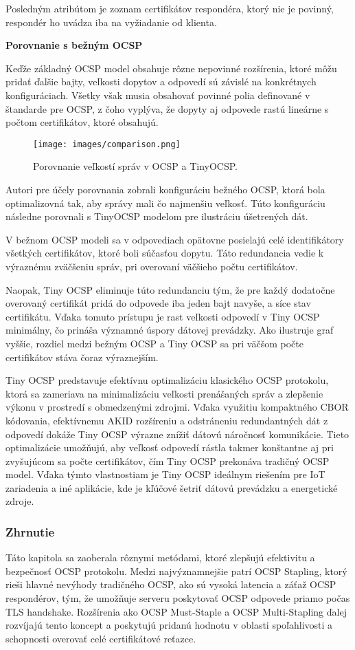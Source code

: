 \documentclass[12pt, twoside]{book}
\newcommand{\subsubsubsection}[1]{%
  \vspace{0.2em}  
  \textbf{#1} \\[0.2em]
  \hspace*{\parindent}
}
\begin{document}
Posledným atribútom je zoznam certifikátov respondéra, ktorý nie je povinný, respondér ho uvádza iba na vyžiadanie od klienta.


\subsubsubsection{Porovnanie s bežným OCSP}
Keďže základný OCSP model obsahuje rôzne nepovinné rozšírenia, ktoré môžu pridať ďalšie bajty, veľkosti dopytov a odpovedí sú závislé na konkrétnych konfiguráciach. Všetky však musia obsahovať povinné polia definované v štandarde pre OCSP, z čoho vyplýva, že dopyty aj odpovede rastú lineárne s počtom certifikátov, ktoré obsahujú.

\begin{figure}[H]
\centering
\texttt{[image: images/comparison.png]}
\caption{Porovnanie veľkostí správ v OCSP a TinyOCSP.}
\end{figure}

Autori pre účely porovnania zobrali konfiguráciu bežného OCSP, ktorá bola optimalizovná tak, aby správy mali čo najmenšiu veľkosť. Túto konfiguráciu následne porovnali s TinyOCSP modelom pre ilustráciu úšetrených dát.

V bežnom OCSP modeli sa v odpovediach opätovne posielajú celé identifikátory všetkých certifikátov, ktoré boli súčasťou dopytu. Táto redundancia vedie k výraznému zväčšeniu správ, pri overovaní väčšieho počtu certifikátov.

Naopak, Tiny OCSP eliminuje túto redundanciu tým, že pre každý dodatočne overovaný certifikát pridá do odpovede iba jeden bajt navyše, a síce stav certifikátu. Vďaka tomuto prístupu je rast veľkosti odpovedí v Tiny OCSP minimálny, čo prináša významné úspory dátovej prevádzky. Ako ilustruje graf vyššie, rozdiel medzi bežným OCSP a Tiny OCSP sa pri väčšom počte certifikátov stáva čoraz výraznejším. 

Tiny OCSP predstavuje efektívnu optimalizáciu klasického OCSP protokolu, ktorá sa zameriava na minimalizáciu veľkosti prenášaných správ a zlepšenie výkonu v prostredí s obmedzenými zdrojmi. Vďaka využitiu kompaktného CBOR kódovania, efektívnemu AKID rozšíreniu a odstráneniu redundantných dát z odpovedí dokáže Tiny OCSP výrazne znížiť dátovú náročnosť komunikácie. Tieto optimalizácie umožňujú, aby veľkosť odpovedí rástla takmer konštantne aj pri zvyšujúcom sa počte certifikátov, čím Tiny OCSP prekonáva tradičný OCSP model. Vďaka týmto vlastnostiam je Tiny OCSP ideálnym riešením pre IoT zariadenia a iné aplikácie, kde je kľúčové šetriť dátovú prevádzku a energetické zdroje.


\subsubsection{Zhrnutie}
Táto kapitola sa zaoberala rôznymi metódami, ktoré zlepšujú efektivitu a bezpečnosť OCSP protokolu. Medzi najvýznamnejšie patrí OCSP Stapling, ktorý rieši hlavné nevýhody tradičného OCSP, ako sú vysoká latencia a záťaž OCSP respondérov, tým, že umožňuje serveru poskytovať OCSP odpovede priamo počas TLS handshake. Rozšírenia ako OCSP Must-Staple a OCSP Multi-Stapling ďalej rozvíjajú tento koncept a poskytujú pridanú hodnotu v oblasti spoľahlivosti a schopnosti overovať celé certifikátové reťazce.
\end{document}
